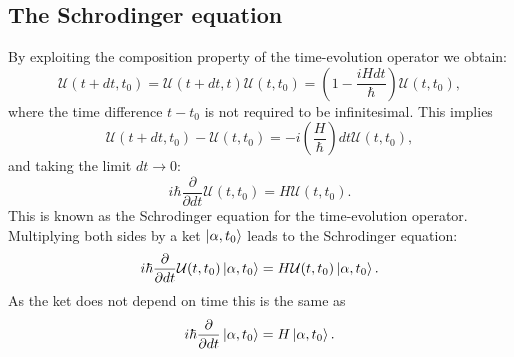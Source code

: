 \subsection{The Schrodinger equation}
By exploiting the composition property of the time-evolution
operator we obtain:
$$ \mathcal{U}(t + dt, t_0) = \mathcal{U}(t + dt, t)
    \mathcal{U}(t, t_0) = (1 - \frac{i H dt}{\hbar})
    \mathcal{U}(t, t_0) ,$$
where the time difference $t - t_0$ is not required to be infinitesimal.
This implies
$$ \mathcal{U}(t + dt, t_0) - \mathcal{U}(t, t_0) =
    -i(\frac{H}{\hbar}) dt \mathcal{U}(t, t_0) ,$$
and taking the limit $dt \rightarrow 0$:
$$ i \hbar \frac{\partial}{\partial dt} \mathcal{U}(t, t_0)
    = H \mathcal{U}(t, t_0) .$$
This is known as the Schrodinger equation for the time-evolution operator.
Multiplying both sides by a ket $\ket{\alpha, t_0}$ leads to the
Schrodinger equation:
$$ i \hbar \frac{\partial}{\partial dt} \mathcal{U}(t, t_0)
    \ket{\alpha, t_0} = H \mathcal{U}(t, t_0) \ket{\alpha, t_0} .$$
As the ket does not depend on time this is the same as
$$ i \hbar \frac{\partial}{\partial dt}
    \ket{\alpha, t_0} = H \ket{\alpha, t_0} .$$
